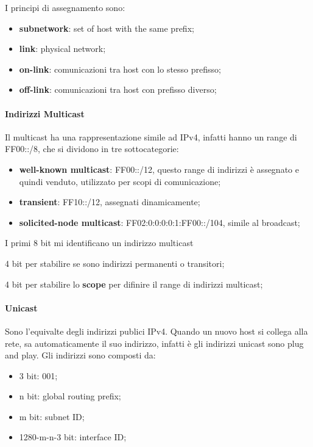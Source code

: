 \documentclass[12pt]{article}
\begin{document}
I principi di assegnamento sono:
\begin{itemize}
    \item \textbf{subnetwork}: set of host with the same prefix;
    \item \textbf{link}: physical network;
    \item \textbf{on-link}: comunicazioni tra host con lo stesso prefisso;
    \item \textbf{off-link}: comunicazioni tra host con prefisso diverso;
\end{itemize}

\paragraph{Indirizzi Multicast}
Il multicast ha una rappresentazione simile ad IPv4, infatti hanno un range di FF00::/8, che si dividono in tre sottocategorie:
\begin{itemize}
    \item \textbf{well-known multicast}: FF00::/12, questo range di indirizzi \`e assegnato e quindi venduto, utilizzato per scopi di comunicazione;
    \item \textbf{transient}: FF10::/12, assegnati dinamicamente;
    \item \textbf{solicited-node multicast}: FF02:0:0:0:0:1:FF00::/104, simile al broadcast;
\end{itemize}

I primi 8 bit mi identificano un indirizzo multicast

4 bit per stabilire se sono indirizzi permanenti o transitori;

4 bit per stabilire lo \textbf{scope} per difinire il range di indirizzi multicast;

\paragraph{Unicast}
Sono l'equivalte degli indirizzi publici IPv4. Quando un nuovo host si collega alla rete, sa automaticamente il suo indirizzo, infatti \`e gli indirizzi unicast sono plug and play. Gli indirizzi sono composti da:
\begin{itemize}
    \item 3 bit: 001;
    \item n bit: global routing prefix;
    \item m bit: subnet ID;
    \item 1280-m-n-3 bit: interface ID;
\end{itemize}
\end{document}
